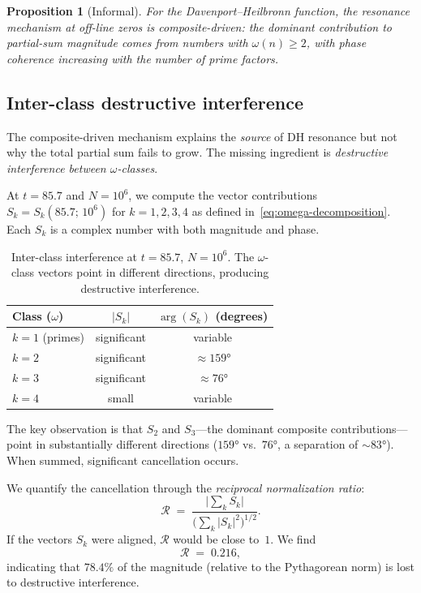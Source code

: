 \documentclass[11pt]{amsart}
\newtheorem{proposition}[theorem]{Proposition}
\theoremstyle{definition}
\theoremstyle{remark}
\newcommand{\abs}[1]{\lvert #1 \rvert}
\begin{document}
\begin{proposition}[Informal]
For the Davenport--Heilbronn function, the resonance mechanism at
off-line zeros is composite-driven: the dominant contribution to
partial-sum magnitude comes from numbers with $\omega(n) \ge 2$,
with phase coherence increasing with the number of prime factors.
\end{proposition}

\subsection{Inter-class destructive interference}
\label{ssec:interference}

The composite-driven mechanism explains the \emph{source} of DH
resonance but not why the total partial sum fails to grow.  The
missing ingredient is \emph{destructive interference between
$\omega$-classes}.

At $t = 85.7$ and $N = 10^6$, we compute the vector contributions
$S_k = S_k(85.7;\, 10^6)$ for $k = 1, 2, 3, 4$ as defined
in~\eqref{eq:omega-decomposition}.  Each $S_k$ is a complex number
with both magnitude and phase.

\begin{table}[ht]
\centering
\caption{Inter-class interference at $t = 85.7$, $N = 10^6$.
  The $\omega$-class vectors point in different directions,
  producing destructive interference.}
\label{tab:interference}
\begin{tabular}{@{}lcc@{}}
\toprule
Class ($\omega$) & $\abs{S_k}$ & $\arg(S_k)$ (degrees) \\
\midrule
$k = 1$ (primes)   & significant & variable \\
$k = 2$            & significant & $\approx 159°$ \\
$k = 3$            & significant & $\approx 76°$ \\
$k = 4$            & small       & variable \\
\bottomrule
\end{tabular}
\end{table}

The key observation is that $S_2$ and $S_3$---the dominant composite
contributions---point in substantially different directions
($159°$ vs.\ $76°$, a separation of $\sim 83°$).  When summed,
significant cancellation occurs.

We quantify the cancellation through the
\emph{reciprocal normalization ratio}:
\begin{equation}\label{eq:cancellation}
  \mathcal{R} \;=\;
  \frac{\bigl\lvert \sum_k S_k \bigr\rvert}
       {\bigl(\sum_k \abs{S_k}^2\bigr)^{1/2}}.
\end{equation}
If the vectors $S_k$ were aligned, $\mathcal{R}$ would be close
to~$1$.  We find
\begin{equation}
  \mathcal{R} \;=\; 0.216,
\end{equation}
indicating that $78.4\%$ of the magnitude (relative to the
Pythagorean norm) is lost to destructive interference.
\end{document}
